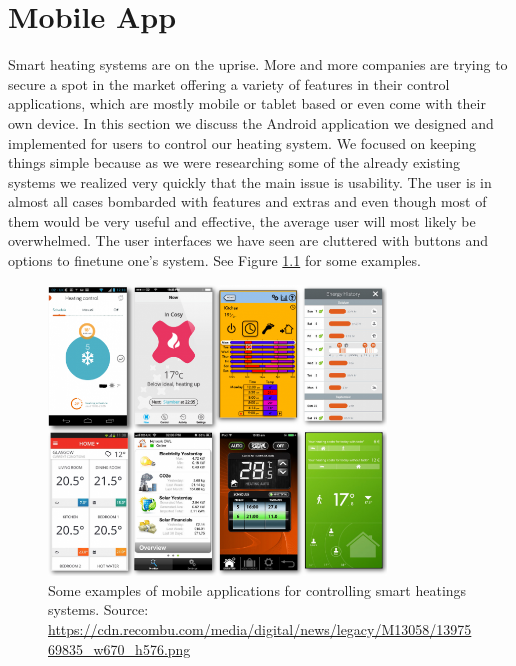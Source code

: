 
\chapter{Mobile App}
\label{sec:mobile_app}

Smart heating systems are on the uprise. More and more companies are trying to secure a spot in the market offering a variety of features in their control applications, which are mostly mobile or tablet based or even come with their own device. In this section we discuss the Android application we designed and implemented for users to control our heating system. We focused on keeping things simple because as we were researching some of the already existing systems we realized very quickly that the main issue is usability. The user is in almost all cases bombarded with features and extras and even though most of them would be very useful and effective, the average user will most likely be overwhelmed. The user interfaces we have seen are cluttered with buttons and options to finetune one's system. See Figure \ref{fig:smart_heating_apps} for some examples.

\begin{figure}[h]
	\begin{center}
		\includegraphics[width=0.8\textwidth]{images/smart_heating_apps.png}
	\end{center}
	\caption{Some examples of mobile applications for controlling smart heatings systems. Source: \url{https://cdn.recombu.com/media/digital/news/legacy/M13058/1397569835_w670_h576.png}}
	\label{fig:smart_heating_apps}
\end{figure}


